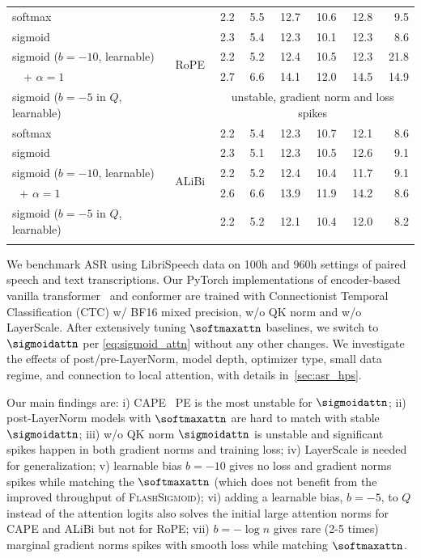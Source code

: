 \begin{table}[t!]
\begin{center}
\begin{scriptsize}
\begin{sc}
{\begin{tabular}{lc|rr|rrrr}
\midrule
softmax & \multirow{5}{*}{RoPE} & 2.2 & 5.5 & 12.7 & 10.6 & 12.8 & 9.5 \\
 sigmoid &  & 2.3 & 5.4 & 12.3 & 10.1 & 12.3 & 8.6 \\
 sigmoid ($b=-10$, learnable) &  & 2.2 & 5.2 & 12.4 & 10.5 & 12.3 & 21.8 \\
 \,\,\,\, + $\alpha=1$ &  & 2.7 & 6.6 & 14.1 & 12.0 & 14.5 & 14.9 \\
 sigmoid ($b=-5$ in $Q$, learnable) &  & \multicolumn{6}{c}{unstable, gradient norm and loss spikes} \\
\midrule
 softmax & \multirow{5}{*}{ALiBi} & 2.2 & 5.4 & 12.3 & 10.7 & 12.1 & 8.6 \\
 sigmoid &  & 2.3 & 5.1 & 12.3 & 10.5 & 12.6 & 9.1 \\
 sigmoid ($b=-10$, learnable) &  & 2.2 & 5.2 & 12.4 & 10.4 & 11.7 & 9.1 \\
 \,\, + $\alpha=1$ &  & 2.6 & 6.6 & 13.9 & 11.9 & 14.2 & 8.6 \\
 sigmoid ($b=-5$ in $Q$, learnable) &  & 2.2 & 5.2 & 12.1 & 10.4 & 12.0 & 8.2 \\
\bottomrule
\vspace{-0.4cm}
\end{tabular}
}
\end{sc}
\end{scriptsize}
\end{center}
\end{table}
We benchmark ASR using LibriSpeech data \citep{DBLP:conf/icassp/PanayotovCPK15} on 100h and 960h settings of paired speech and text transcriptions. Our PyTorch implementations of encoder-based vanilla transformer~\citep{synnaeve2019end} and conformer \citep{DBLP:conf/interspeech/GulatiQCPZYHWZW20} are trained with Connectionist Temporal Classification (CTC) \citep{DBLP:conf/icml/GravesFGS06} w/ BF16 mixed precision, w/o QK norm and w/o LayerScale. After extensively tuning $\softmaxattn$ baselines, we switch to $\sigmoidattn$ per \cref{eq:sigmoid_attn} without any other changes. We investigate the effects of post/pre-LayerNorm, model depth, optimizer type, small data regime, and connection to local attention, with details in~\cref{sec:asr_hps}.

Our main findings are: i) CAPE~\citep{DBLP:conf/nips/LikhomanenkoXSC21} PE is the most unstable for $\sigmoidattn$; ii) post-LayerNorm models with $\softmaxattn$ are hard to match with stable $\sigmoidattn$; iii) w/o QK norm $\sigmoidattn$ is unstable and significant spikes happen in both gradient norms and training loss; iv) LayerScale is needed for generalization; v) learnable bias $b=-10$ gives no loss and gradient norms spikes while matching the $\softmaxattn$ (which does not benefit from the improved throughput of \textsc{FlashSigmoid}); vi) adding a learnable bias, $b=-5$, to $Q$ instead of the attention logits also solves the initial large attention norms for CAPE and ALiBi but not for RoPE; vii) $b=-\log n$ gives rare (2-5 times) marginal gradient norms spikes with smooth loss while matching $\softmaxattn$.


